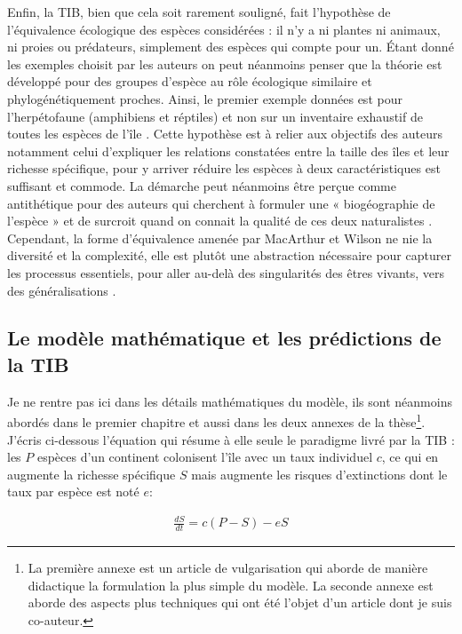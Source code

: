 Enfin, la TIB, bien que cela soit rarement souligné, fait l'hypothèse de
l'équivalence écologique des espèces considérées : il n'y a ni plantes
ni animaux, ni proies ou prédateurs, simplement des espèces qui compte
pour un. Étant donné les exemples choisit par les auteurs on peut
néanmoins penser que la théorie est développé pour des groupes d'espèce
au rôle écologique similaire et phylogénétiquement proches. Ainsi, le
premier exemple données est pour l'herpétofaune (amphibiens et réptiles)
et non sur un inventaire exhaustif de toutes les espèces de l'île
\citep{MacArthur1967}. Cette hypothèse est à relier aux objectifs des
auteurs notamment celui d'expliquer les relations constatées entre la
taille des îles et leur richesse spécifique, pour y arriver réduire les
espèces à deux caractéristiques est suffisant et commode. La démarche
peut néanmoins être perçue comme antithétique pour des auteurs qui
cherchent à formuler une « biogéographie de l'espèce » et de surcroit
quand on connait la qualité de ces deux naturalistes
\citep{Lomolino2009}. Cependant, la forme d'équivalence amenée par
MacArthur et Wilson ne nie la diversité et la complexité, elle est
plutôt une abstraction nécessaire pour capturer les processus
essentiels, pour aller au-delà des singularités des êtres vivants, vers
des généralisations \citep{Lomolino2009}.

\subsection*{Le modèle mathématique et les prédictions de la
TIB}\label{le-moduxe8le-mathuxe9matique-et-les-pruxe9dictions-de-la-tib}

Je ne rentre pas ici dans les détails mathématiques du modèle, ils sont
néanmoins abordés dans le premier chapitre et aussi dans les deux
annexes de la thèse\footnote{La première annexe est un article de
  vulgarisation qui aborde de manière didactique la formulation la plus
  simple du modèle. La seconde annexe est aborde des aspects plus
  techniques qui ont été l'objet d'un article dont je suis co-auteur.}.
J'écris ci-dessous l'équation qui résume à elle seule le paradigme livré
par la TIB : les \(P\) espèces d'un continent colonisent l'île avec un
taux individuel \(c\), ce qui en augmente la richesse spécifique \(S\)
mais augmente les risques d'extinctions dont le taux par espèce est noté
\(e\):

\begin{eqnarray}
\label{eqMW}
\frac{dS}{dt} = c(P-S)-eS
\end{eqnarray}

